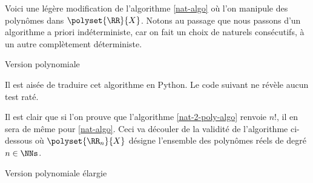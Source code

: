 Voici une légère modification de l'algorithme \ref{nat-algo} où l'on manipule des polynômes dans $\polyset{\RR}{X}$.
Notons au passage que nous passons d'un algorithme a priori indéterministe, car on fait un choix de naturels consécutifs, à un autre complètement déterministe.

\begin{algo}
	\caption{Version polynomiale} \label{nat-2-poly-algo}

	
	\addalgoblank
	
\end{algo}


Il est aisée de traduire cet algorithme en Python. Le code suivant ne révèle aucun test raté.

\medskip



\medskip


Il est clair que si l'on prouve que l'algorithme \ref{nat-2-poly-algo} renvoie $n!$, il en sera de même pour \ref{nat-algo}. Ceci va découler de la validité de l'algorithme ci-dessous où $\polyset{\RR_{n}}{X}$ désigne l'ensemble des polynômes réels de degré $n \in \NNs$.

\medskip

\begin{algo}
	\caption{Version polynomiale élargie} \label{gene-poly-algo}

	
	\addalgoblank
	
\end{algo}


\medskip


